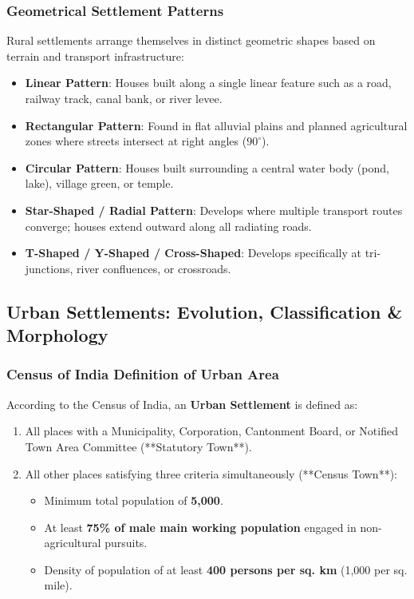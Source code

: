 \documentclass[11pt,a4paper]{article}
\begin{document}
\subsubsection{Geometrical Settlement Patterns}
Rural settlements arrange themselves in distinct geometric shapes based on terrain and transport infrastructure:
\begin{itemize}[leftmargin=*]
  \item \textbf{Linear Pattern}: Houses built along a single linear feature such as a road, railway track, canal bank, or river levee.
  \item \textbf{Rectangular Pattern}: Found in flat alluvial plains and planned agricultural zones where streets intersect at right angles ($90^\circ$).
  \item \textbf{Circular Pattern}: Houses built surrounding a central water body (pond, lake), village green, or temple.
  \item \textbf{Star-Shaped / Radial Pattern}: Develops where multiple transport routes converge; houses extend outward along all radiating roads.
  \item \textbf{T-Shaped / Y-Shaped / Cross-Shaped}: Develops specifically at tri-junctions, river confluences, or crossroads.
\end{itemize}

\newpage
\subsection{Urban Settlements: Evolution, Classification & Morphology}

\subsubsection{Census of India Definition of Urban Area}
According to the Census of India, an \textbf{Urban Settlement} is defined as:
\begin{enumerate}[leftmargin=*]
  \item All places with a Municipality, Corporation, Cantonment Board, or Notified Town Area Committee (**Statutory Town**).
  \item All other places satisfying three criteria simultaneously (**Census Town**):
  \begin{itemize}
    \item Minimum total population of \textbf{5,000}.
    \item At least \textbf{75\% of male main working population} engaged in non-agricultural pursuits.
    \item Density of population of at least \textbf{400 persons per sq. km} (1,000 per sq. mile).
  \end{itemize}
\end{enumerate}
\end{document}
